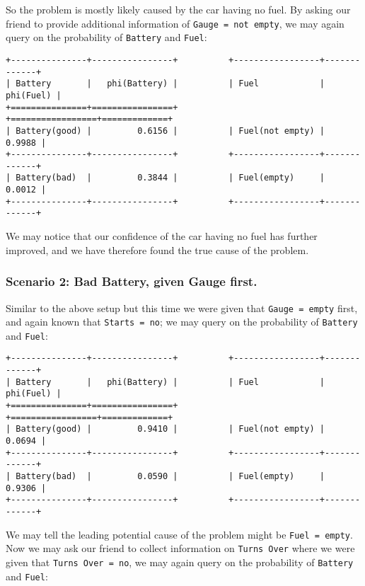 \documentclass[11pt]{article}
\newcommand{\ilc}{\texttt}
\begin{document}
So the problem is mostly likely caused by the car having no fuel. By asking our friend to provide additional information of \ilc{Gauge = not empty}, we may again query on the probability of \ilc{Battery} and \ilc{Fuel}:
\begin{lstlisting}
+---------------+----------------+          +-----------------+-------------+
| Battery       |   phi(Battery) |          | Fuel            |   phi(Fuel) |
+===============+================+          +=================+=============+
| Battery(good) |         0.6156 |          | Fuel(not empty) |      0.9988 |
+---------------+----------------+          +-----------------+-------------+
| Battery(bad)  |         0.3844 |          | Fuel(empty)     |      0.0012 |
+---------------+----------------+          +-----------------+-------------+
\end{lstlisting}

We may notice that our confidence of the car having no fuel has further improved, and we have therefore found the true cause of the problem.

\subsubsection*{Scenario 2: Bad Battery, given Gauge first.}

Similar to the above setup but this time we were given that \ilc{Gauge = empty} first, and again known that \ilc{Starts = no}; we may query on the probability of \ilc{Battery} and \ilc{Fuel}:

\begin{lstlisting}
+---------------+----------------+          +-----------------+-------------+
| Battery       |   phi(Battery) |          | Fuel            |   phi(Fuel) |
+===============+================+          +=================+=============+
| Battery(good) |         0.9410 |          | Fuel(not empty) |      0.0694 |
+---------------+----------------+          +-----------------+-------------+
| Battery(bad)  |         0.0590 |          | Fuel(empty)     |      0.9306 |
+---------------+----------------+          +-----------------+-------------+
\end{lstlisting}

We may tell the leading potential cause of the problem might be \ilc{Fuel = empty}. Now we may ask our friend to collect information on \ilc{Turns Over} where we were given that \ilc{Turns Over = no}, we may again query on the probability of \ilc{Battery} and \ilc{Fuel}:
\end{document}
